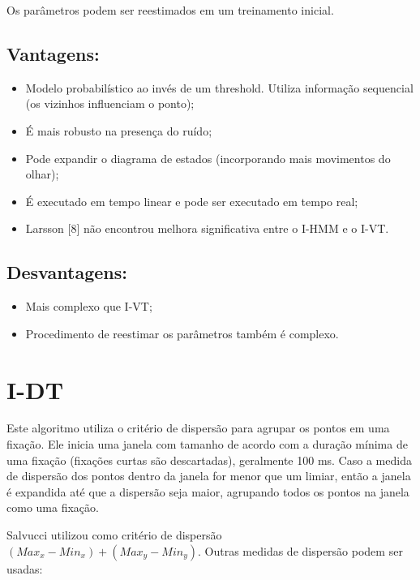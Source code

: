 \documentclass[brazil,]{report}
\begin{document}
Os parâmetros podem ser reestimados em um treinamento inicial.

\subsection{Vantagens:}\label{vantagens-1}

\begin{itemize}
\itemsep1pt\parskip0pt
\item
  Modelo probabilístico ao invés de um threshold. Utiliza informação
  sequencial (os vizinhos influenciam o ponto);
\item
  É mais robusto na presença do ruído;
\item
  Pode expandir o diagrama de estados (incorporando mais movimentos do
  olhar);
\item
  É executado em tempo linear e pode ser executado em tempo real;
\item
  Larsson {[}8{]} não encontrou melhora significativa entre o
  \gls{I-HMM} e o \gls{I-VT}.
\end{itemize}

\subsection{Desvantagens:}\label{desvantagens-1}

\begin{itemize}
\itemsep1pt\parskip0pt
\item
  Mais complexo que \gls{I-VT};
\item
  Procedimento de reestimar os parâmetros também é complexo.
\end{itemize}

\section{\gls{I-DT}}\label{section-2}

Este algoritmo utiliza o critério de dispersão para agrupar os pontos em
uma fixação. Ele inicia uma janela com tamanho de acordo com a duração
mínima de uma fixação (fixações curtas são descartadas), geralmente 100
ms. Caso a medida de dispersão dos pontos dentro da janela for menor que
um limiar, então a janela é expandida até que a dispersão seja maior,
agrupando todos os pontos na janela como uma fixação.

Salvucci utilizou como critério de dispersão
$(Max_x - Min_x) + (Max_y - Min_y)$. Outras medidas de dispersão podem
ser usadas:
\end{document}
